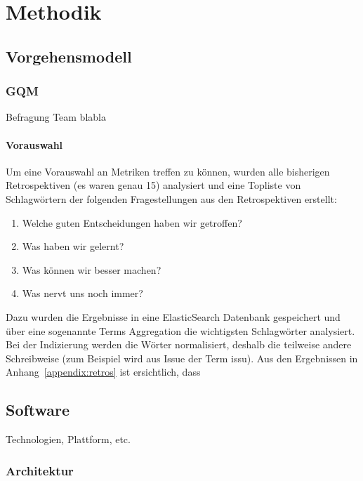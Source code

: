 \chapter{Methodik}

\section{Vorgehensmodell}

\subsection{\ac{GQM}}

Befragung Team blabla

\subsubsection{Vorauswahl}

Um eine Vorauswahl an Metriken treffen zu können, wurden alle bisherigen Retrospektiven (es waren genau 15) analysiert und eine Topliste von Schlagwörtern der folgenden Fragestellungen aus den Retrospektiven erstellt:
\begin{enumerate}
    \item Welche guten Entscheidungen haben wir getroffen?
    \item Was haben wir gelernt?
    \item Was können wir besser machen?
    \item Was nervt uns noch immer?
\end{enumerate}

Dazu wurden die Ergebnisse in eine ElasticSearch Datenbank gespeichert und über eine sogenannte Terms Aggregation die wichtigsten Schlagwörter analysiert.
Bei der Indizierung werden die Wörter normalisiert, deshalb die teilweise andere Schreibweise (zum Beispiel wird aus Issue der Term issu).
\newline
Aus den Ergebnissen in Anhang~\ref{appendix:retros} ist ersichtlich, dass

\section{Software}

Technologien, Plattform, etc.

\subsection{Architektur}

